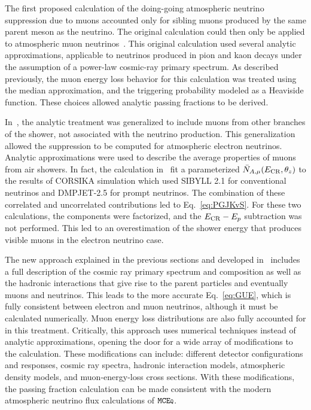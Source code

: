 The first proposed calculation of the doing-going atmospheric neutrino suppression due to muons accounted only for sibling muons produced by the same parent meson as the neutrino.
The original calculation could then only be applied to atmospheric muon neutrinos~\cite{Schonert:2008is}.
This original calculation used several analytic approximations, applicable to neutrinos produced in pion and kaon decays under the assumption of a power-law cosmic-ray primary spectrum.
As described previously, the muon energy loss behavior for this calculation was treated using the median approximation, and the triggering probability modeled as a Heaviside function.
These choices allowed analytic passing fractions to be derived.

In~\cite{Gaisser:2014bja}, the analytic treatment was generalized to include muons from other branches of the shower, not associated with the neutrino production.
This generalization allowed the suppression to be computed for atmospheric electron neutrinos.
Analytic approximations were used to describe the average properties of muons from air showers.
In fact, the calculation in~\cite{Gaisser:2014bja} fit a parameterized $\bar N_{A,\mu}(E_{\rm CR}, \theta_z)$ to the results of CORSIKA simulation which used SIBYLL 2.1 for conventional neutrinos and DMPJET-2.5 for prompt neutrinos.
The combination of these correlated and uncorrelated contributions led to Eq.~\ref{eq:PGJKvS}.
For these two calculations, the components were factorized, and the $E_{\rm CR}-E_p$ subtraction was not performed.
This led to an overestimation of the shower energy that produces visible muons in the electron neutrino case.

The new approach explained in the previous sections and developed in~\cite{Arguelles:2018awr} includes a full description of the cosmic ray primary spectrum and composition as well as the hadronic interactions that give rise to the parent particles and eventually muons and neutrinos.
This leads to the more accurate Eq.~\ref{eq:GUE}, which is fully consistent between electron and muon neutrinos, although it must be calculated numerically.
Muon energy loss distributions are also fully accounted for in this treatment.
Critically, this approach uses numerical techniques instead of analytic approximations, opening the door for a wide array of modifications to the calculation.
These modifications can include: different detector configurations and responses, cosmic ray spectra, hadronic interaction models, atmospheric density models, and muon-energy-loss cross sections.
With these modifications, the passing fraction calculation can be made consistent with the modern atmospheric neutrino flux calculations of $\texttt{MCE{\scriptsize Q}}$.

